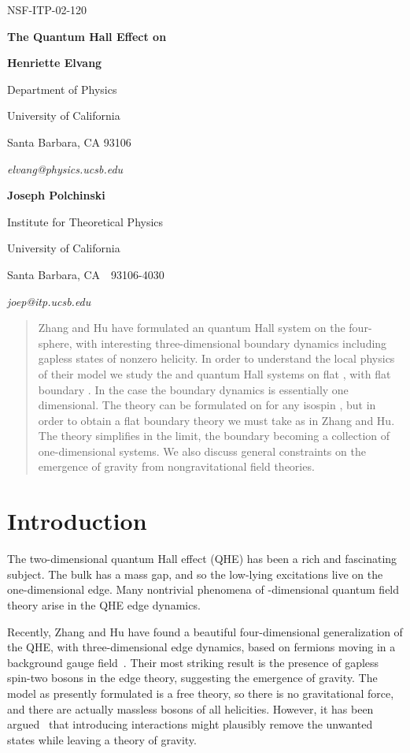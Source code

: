 \documentclass[a4paper,12pt]{article}
\providecommand{\R}{R}
\providecommand{\sect}[1]{\section{#1}\setcounter{equation}{0}}
\begin{document}
\bigskip
\hskip 5in\vbox{\baselineskip12pt
\hbox{NSF-ITP-02-120}
}
\bigskip\bigskip

\centerline{\Large \bf The Quantum Hall Effect on \coordHE{}
}
\bigskip
\centerline{\bf Henriette Elvang}
\medskip
\centerline{Department of Physics}
\centerline{University of California}
\centerline{Santa Barbara, CA 93106}
\centerline{\it elvang@physics.ucsb.edu}
\bigskip
\centerline{\bf Joseph Polchinski}
\medskip
\centerline{Institute for Theoretical Physics}
\centerline{University of California}
\centerline{Santa Barbara, CA\ \ 93106-4030}
\centerline{\it joep@itp.ucsb.edu}


\begin{abstract}
Zhang and Hu have formulated an \coordHE{} quantum Hall system on the
four-sphere, with interesting three-dimensional boundary dynamics including
gapless states of nonzero helicity.  In order to understand the local physics
of their model we study the
\coordHE{} and
\coordHE{} quantum Hall systems on flat \myHighlight{$\R^4$}\coordHE{}, with flat boundary \myHighlight{$\R^3$}\coordHE{}.  In the
\coordHE{} case the boundary dynamics is essentially one dimensional.  The \coordHE{}
theory can be formulated on \myHighlight{$\R^4$}\coordHE{} for any isospin \coordHE{}, but in order to obtain
a flat boundary theory we must take \coordHE{} as in Zhang and Hu.  The
theory simplifies in the limit, the boundary becoming a collection of
one-dimensional systems.  We also discuss general constraints on the emergence
of gravity from nongravitational field theories.


\end{abstract}

\newpage
\baselineskip=18pt

\sect{Introduction}

The two-dimensional quantum Hall effect (QHE) has been a rich and
fascinating subject.  The bulk has a mass gap, and so the
low-lying excitations live on the one-dimensional edge.  Many nontrivial
phenomena of \coordHE{}-dimensional quantum field theory arise in the QHE edge
dynamics.

Recently, Zhang and Hu have found a beautiful four-dimensional
generalization of the QHE, with three-dimensional edge
dynamics, based on fermions moving in a background \coordHE{} gauge
field~\cite{hz1,hz2}.   Their most striking result is the presence of
gapless spin-two bosons in the edge theory, suggesting the
emergence of gravity.  The model as presently formulated
is a free theory, so there is no gravitational force, and there are
actually massless bosons of all helicities.  However, it has been
argued~\cite{hz1} that introducing interactions might plausibly remove the
unwanted states while leaving a theory of gravity.
\end{document}
